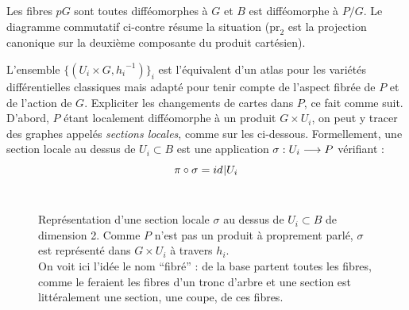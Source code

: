 \begin{definition}
\begin{adjustbox}{valign=C,raise=1cm, minipage={1.1\linewidth}}
		Les fibres $pG$ sont toutes difféomorphes à $G$ et $B$ est difféomorphe à $P/G$. Le diagramme commutatif ci-contre résume la situation ($\text{pr}_2$ est la projection canonique sur la deuxième composante du produit cartésien).
	\end{adjustbox}
\end{definition}
\skipl 


L'ensemble $\big\{(U_i\times G, {h_i}^{-1})\big\}_i$ est l'équivalent d'un atlas pour les variétés différentielles classiques mais adapté pour tenir compte de l'aspect fibrée de $P$ et de l'action de $G$. Expliciter les changements de cartes dans $P$, ce fait comme suit.
\\
D'abord, $P$ étant localement difféomorphe à un produit $G\times U_i$, on peut y tracer des graphes appelés \emph{sections locales}, comme sur les  ci-dessous. Formellement, une section locale au dessus  de $U_i \subset B$ est une application $\sigma : U_i \longrightarrow P$ vérifiant :
\[\pi\circ \sigma = id_{}{{\displaystyle |}U_i}\]
\\

\begin{figure}[h]
	
	\caption[\DONE Représentation d'une section local]
		{Représentation d'une section locale $\sigma$ au dessus de $U_i\subset B$ de dimension 2. 
		Comme $P$ n'est pas un produit à proprement parlé, $\sigma$ est représenté dans $G\times U_i$ à travers $h_i$. \\
		On voit ici l'idée le nom ``fibré'' : de la base partent toutes les fibres, comme le feraient les fibres d'un tronc d'arbre et une section est littéralement une section, une coupe, de ces fibres.}
	\label{fig:section_local}
\end{figure}
\skipl

